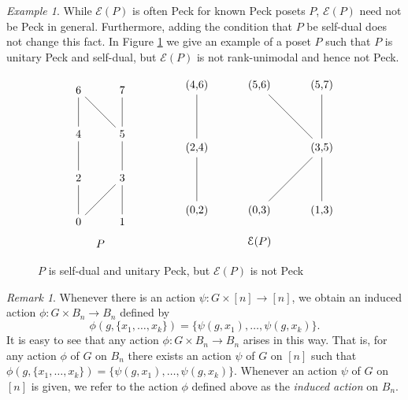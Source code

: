 \documentclass[smallextended, envcountsame, numbook]{svjour3}
\theoremstyle{plain}
\theoremstyle{definition}
\theoremstyle{remark}
\newtheorem{rmk}[thm]{Remark}
\newtheorem{eg}[thm]{Example}
\numberwithin{equation}{section}
\begin{document}
\begin{eg}
While $\mathcal{E}(P)$ is often Peck for known Peck posets $P$, $\mathcal E(P)$ need not be Peck in general.  Furthermore, adding the condition that $P$ be self-dual does not change this fact.  In Figure \ref{fig:dual_not_unimodal} we give an example of a poset $P$ such that $P$ is unitary Peck and self-dual, but $\mathcal{E}(P)$ is not rank-unimodal and hence not Peck.
\end{eg}

\begin{figure}[h]
\[
\begin{tikzpicture}[scale = .7]
  \node (0) at (0,0) {0};
  \node (1) at (2,0) {1};
  \node (2) at (0,2) {2};
  \node (3) at (2,2) {3};
  \node (4) at (0,4) {4};
  \node (5) at (2,4) {5};
  \node (6) at (0,6) {6};
  \node (7) at (2,6) {7};
  \draw (0)--(2);
  \draw (0)--(3);
  \draw (1)--(3);
  \draw (2)--(4);
  \draw (3)--(5);
  \draw (4)--(6);
  \draw (5)--(6);
  \draw (5)--(7);
  \node (8) at (1,-1) {$P$};
\end{tikzpicture}\qquad \hspace{10mm}
\begin{tikzpicture}
  \node (02) at (0,0) {(0,2)};
  \node (03) at (2,0) {(0,3)};
  \node (13) at (4,0) {(1,3)};
  \node (24) at (0,2) {(2,4)};
  \node (35) at (4,2) {(3,5)};
  \node (46) at (0,4) {(4,6)};
  \node (56) at (2,4) {(5,6)};
  \node (57) at (4,4) {(5,7)};
  \draw (02)--(24);
  \draw (03)--(35);
  \draw (13)--(35);
  \draw (24)--(46);
  \draw (35)--(56);
  \draw (35)--(57);
  \node (0) at (2,-1) {$\mathcal{E}(P)$};
\end{tikzpicture}\]
\caption{\label{fig:dual_not_unimodal}$P$ is self-dual and unitary Peck, but $\mathcal{E}(P)$ is not Peck}
\end{figure}


\begin{rmk}
\label{rem:induced_action_bn}
Whenever there is an action $\psi\colon G \times [n] \rightarrow [n]$, we obtain an induced action $\phi: G \times B_n \rightarrow B_n$ defined by
$$\phi(g,\{x_1,\ldots, x_k\}) = \{\psi(g,x_1),\ldots, \psi(g,x_k)\}.$$
It is easy to see that any action $\phi\colon G \times B_n \rightarrow B_n$ arises in this way. That is, for any action $\phi$ of $G$ on $B_n$ there exists an action $\psi$ of $G$ on $[n]$ such that $\phi(g,\{x_1,\ldots, x_k\}) = \{\psi(g,x_1),\ldots, \psi(g,x_k)\}$. Whenever an action $\psi$ of $G$ on $[n]$ is given, we refer to the action $\phi$ defined above as the {\it induced action} on $B_n$.
\end{rmk}
\end{document}
